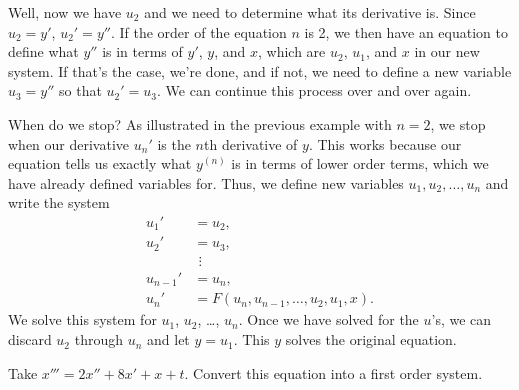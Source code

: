 Well, now we have $u_2$ and we need to determine what its derivative is. Since $u_2 = y'$, $u_2' = y''$. If the order of the equation $n$ is 2, we then have an equation to define what $y''$ is in terms of $y'$, $y$, and $x$, which are $u_2$, $u_1$, and $x$ in our new system. If that's the case, we're done, and if not, we need to define a new variable $u_3 = y''$ so that $u_2' = u_3$. We can continue this process over and over again. 

When do we stop? As illustrated in the previous example with $n=2$, we stop when our derivative $u_n'$ is the $n$th derivative of $y$. This works because our equation tells us exactly what $y^{(n)}$ is in terms of lower order terms, which we have already defined variables for. Thus, we define new variables $u_1, u_2, \ldots, u_n$ and write the system
\begin{align*}
u_1' & = u_2 , \\
u_2' & = u_3 , \\
& ~\, \vdots \\
u_{n-1}' & = u_n , \\
u_n' & = F(u_n,u_{n-1},\ldots,u_2,u_1,x) .
\end{align*}
We solve
this system for $u_1$, $u_2$, \ldots, $u_n$.  Once we have solved
for the $u$'s,
we can discard $u_2$ through $u_n$ and let $y = u_1$.
This $y$ solves the original equation.

\begin{example}
Take $x''' = 2x''+ 8x' + x + t$.  Convert this equation into a first order system. 
\end{example}

